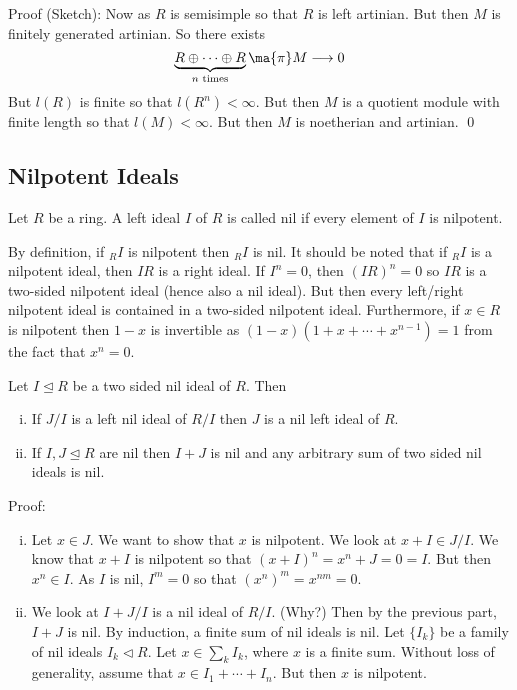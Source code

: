 Proof (Sketch): Now as $R$ is semisimple so that $R$ is left artinian. But then $M$ is finitely generated artinian. So there exists
\[
\underbrace{R \oplus \cdots \oplus R}_{n \text{ times}} \ma{\pi} M \longrightarrow 0
\]
But $l(R)$ is finite so that $l(R^n)<\infty$. But then $M$ is a quotient module with finite length so that $l(M)<\infty$. But then $M$ is noetherian and artinian. \qed \\

\subsection{Nilpotent Ideals} 

\begin{dfn}[Nil]
Let $R$ be a ring. A left ideal $I$ of $R$ is called nil if every element of $I$ is nilpotent.
\end{dfn}

By definition, if $_R I$ is nilpotent then $_R I$ is nil. It should be noted that if $_R I$ is a nilpotent ideal, then $IR$ is a right ideal. If $I^n=0$, then $(IR)^n=0$ so $IR$ is a two-sided nilpotent ideal (hence also a nil ideal). But then every left/right nilpotent ideal is contained in a two-sided nilpotent ideal. Furthermore, if $x \in R$ is nilpotent then $1-x$ is invertible as $(1-x)(1+x+\cdots+x^{n-1})=1$ from the fact that $x^n=0$. 

\begin{prop}
Let $I \unlhd R$ be a two sided nil ideal of $R$. Then
\begin{enumerate}[(i)]
\item If $J/I$ is a left nil ideal of $R/I$ then $J$ is a nil left ideal of $R$.
\item If $I,J \unlhd R$ are nil then $I+J$ is nil and any arbitrary sum of two sided nil ideals is nil.
\end{enumerate}
\end{prop}

Proof:
\begin{enumerate}[(i)]
\item Let $x \in J$. We want to show that $x$ is nilpotent. We look at $x+I \in J/I$. We know that $x+I$ is nilpotent so that $(x+I)^n=x^n+J=0=I$. But then $x^n \in I$. As $I$ is nil, $I^m=0$ so that $(x^n)^m=x^{nm}=0$.
\item We look at $I+J/I$ is a nil ideal of $R/I$. (Why?) Then by the previous part, $I+J$ is nil. By induction, a finite sum of nil ideals is nil. Let $\{I_k\}$ be a family of nil ideals $I_k \lhd R$. Let $x \in \sum_k I_k$, where $x$ is a finite sum. Without loss of generality, assume that $x \in I_1 +\cdots+I_n$. But then $x$ is nilpotent.  
\end{enumerate}

